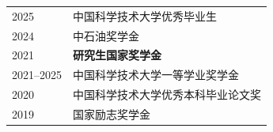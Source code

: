 \begin{longtable}{@{}p{}p{}@{}}
2025 & 中国科学技术大学优秀毕业生 \\
2024 & 中石油奖学金 \\
2021 & \textbf{研究生国家奖学金} \\
2021--2025 & 中国科学技术大学一等学业奖学金 \\
2020 & 中国科学技术大学优秀本科毕业论文奖 \\
2019 & 国家励志奖学金 \\
\end{longtable}
